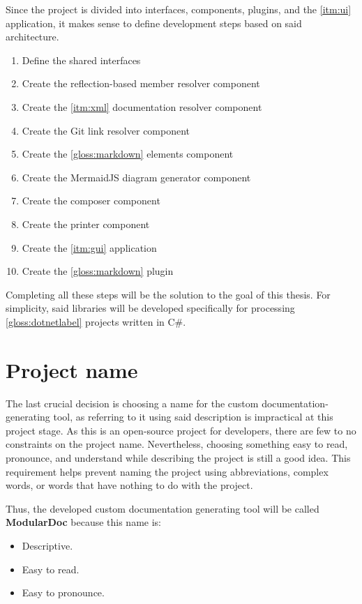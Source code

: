 Since the project is divided into interfaces, components, plugins, and the \ref{itm:ui} application, it makes sense to define development steps based on said architecture.

\begin{enumerate}
    \item \label{num:stage1} Define the shared interfaces
    \item \label{num:stage2} Create the reflection-based member resolver component
    \item \label{num:stage3} Create the \ref{itm:xml} documentation resolver component
    \item \label{num:stage4} Create the Git link resolver component
    \item \label{num:stage5} Create the \ref{gloss:markdown} elements component
    \item \label{num:stage6} Create the MermaidJS diagram generator component
    \item \label{num:stage7} Create the composer component
    \item \label{num:stage8} Create the printer component
    \item \label{num:stage9} Create the \ref{itm:gui} application
    \item \label{num:stage10} Create the \ref{gloss:markdown} plugin
\end{enumerate}

Completing all these steps will be the solution to the goal of this thesis. For simplicity, said libraries will be developed specifically for processing \ref{gloss:dotnetlabel} projects written in C\#.

\section{Project name}

The last crucial decision is choosing a name for the custom documentation-generating tool, as referring to it using said description is impractical at this project stage.
As this is an open-source project for developers, there are few to no constraints on the project name.
Nevertheless, choosing something easy to read, pronounce, and understand while describing the project is still a good idea.
This requirement helps prevent naming the project using abbreviations, complex words, or words that have nothing to do with the project.

Thus, the developed custom documentation generating tool will be called \textbf{ModularDoc} because this name is:
  \begin{itemize}
    \item Descriptive.
    \item Easy to read.
    \item Easy to pronounce.
  \end{itemize}
